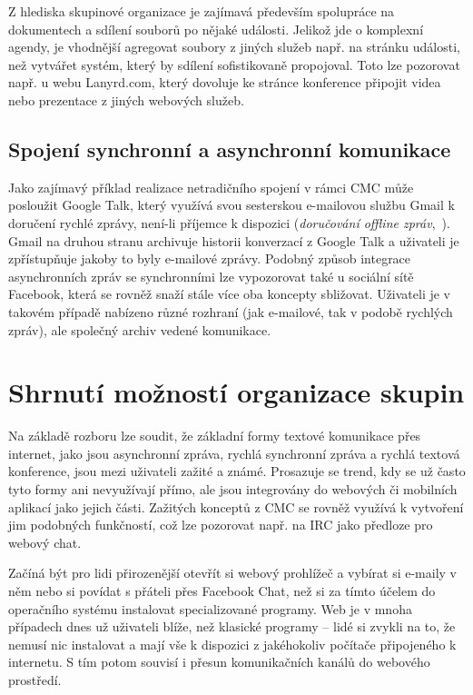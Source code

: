 \documentclass[12pt,oneside,final]{fithesis2}
\begin{document}
Z hlediska skupinové organizace je zajímavá především spolupráce na dokumentech a sdílení souborů po nějaké události. Jelikož jde o komplexní agendy, je vhodnější agregovat soubory z jiných služeb např. na stránku události, než vytvářet systém, který by sdílení sofistikovaně propojoval. Toto lze pozorovat např. u webu Lanyrd.com, který dovoluje ke stránce konference připojit videa nebo prezentace z jiných webových služeb.

\subsection{Spojení synchronní a asynchronní komunikace}\label{syncAsync}
Jako zajímavý příklad realizace netradičního spojení v rámci CMC může posloužit Google Talk, který využívá svou sesterskou e-mailovou službu Gmail k doručení rychlé zprávy, není-li příjemce k dispozici (\emph{doručování offline zpráv},~\cite{lindberg2006offline}). Gmail na druhou stranu archivuje historii konverzací z Google Talk a uživateli je zpřístupňuje jakoby to byly e-mailové zprávy. Podobný způsob integrace asynchronních zpráv se synchronními lze vypozorovat také u sociální sítě Facebook, která se rovněž snaží stále více oba koncepty sbližovat. Uživateli je v takovém případě nabízeno různé rozhraní (jak e-mailové, tak v podobě rychlých zpráv), ale společný archiv vedené komunikace.


\section{Shrnutí možností organizace skupin}\label{optionsConclusion}
Na základě rozboru lze soudit, že základní formy textové komunikace přes internet, jako jsou asynchronní zpráva, rychlá synchronní zpráva a rychlá textová konference, jsou mezi uživateli zažité a známé. Prosazuje se trend, kdy se už často tyto formy ani nevyužívají přímo, ale jsou integrovány do webových či mobilních aplikací jako jejich části. Zažitých konceptů z CMC se rovněž využívá k vytvoření jim podobných funkčností, což lze pozorovat např. na IRC jako předloze pro webový chat.

Začíná být pro lidi přirozenější otevřít si webový prohlížeč a vybírat si e-maily v něm nebo si povídat s přáteli přes Facebook Chat, než si za tímto účelem do operačního systému instalovat specializované programy. Web je v mnoha případech dnes už uživateli blíže, než klasické programy -- lidé si zvykli na to, že nemusí nic instalovat a mají vše k dispozici z jakéhokoliv počítače připojeného k internetu. S tím potom souvisí i přesun komunikačních kanálů do webového prostředí.
\end{document}
